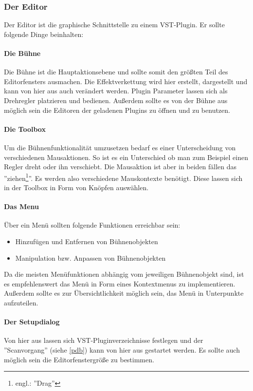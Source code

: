 \subsubsection{Der Editor}
Der Editor ist die graphische Schnittstelle zu einem VST-Plugin. Er sollte folgende Dinge beinhalten:
\paragraph{Die Bühne}
Die Bühne ist die Hauptaktionsebene und sollte somit den größten Teil des Editorfensters ausmachen. Die Effektverkettung wird hier erstellt, dargestellt und kann von hier aus auch verändert werden. Plugin Parameter lassen sich als Drehregler platzieren und bedienen. Außerdem sollte es von der Bühne aus möglich sein die Editoren der geladenen Plugins zu öffnen und zu benutzen. 
\paragraph{Die Toolbox}
Um die Bühnenfunktionalität umzusetzen bedarf es einer Unterscheidung von verschiedenen Mausaktionen. So ist es ein Unterschied ob man zum Beispiel einen Regler dreht oder ihn verschiebt. Die Mausaktion ist aber in beiden fällen das ''ziehen\footnote{engl.: ''Drag''}''. Es werden also verschiedene Mauskontexte benötigt. Diese lassen sich in der Toolbox in Form von Knöpfen auswählen.
\paragraph{Das Menu}
Über ein Menü sollten folgende Funktionen erreichbar sein:
\begin{itemize}
	\item Hinzufügen und Entfernen von Bühnenobjekten
	\item Manipulation bzw. Anpassen von Bühnenobjekten
\end{itemize} 
Da die meisten Menüfunktionen abhängig vom jeweiligen Bühnenobjekt sind, ist es empfehlenswert das Menü in Form eines Kontextmenus zu implementieren. Außerdem sollte es zur Übersichtlichkeit möglich sein, das Menü in Unterpunkte aufzuteilen.
\paragraph{Der Setupdialog}
Von hier aus lassen sich VST-Pluginverzeichnisse festlegen und der ''Scanvorgang'' (siehe \ref{pdb}) kann von hier aus gestartet werden. Es sollte auch möglich sein die Editorfenstergröße zu bestimmen.
